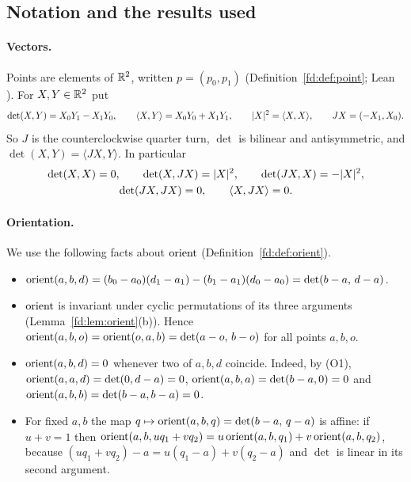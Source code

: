 \subsection{Notation and the results used}\label{lg:ssec:notation}

\paragraph{Vectors.} Points are elements of $\mathbb R^2$, written $p=(p_0,p_1)$ (Definition~\ref{fd:def:point}; Lean
). For $X,Y\in\mathbb R^2$ put
\[
  \det(X,Y)=X_0Y_1-X_1Y_0,\qquad \langle X,Y\rangle=X_0Y_0+X_1Y_1,\qquad \lvert X\rvert^2=\langle X,X\rangle,\qquad
  JX=(-X_1,X_0).
\]
So $J$ is the counterclockwise quarter turn, $\det$ is bilinear and antisymmetric, and $\det(X,Y)=\langle JX,Y\rangle$.
In particular
\begin{equation}\label{lg:eq:J}
\begin{gathered}
  \det(X,X)=0,\qquad \det(X,JX)=\lvert X\rvert^2,\qquad \det(JX,X)=-\lvert X\rvert^2,\\
  \det(JX,JX)=0,\qquad \langle X,JX\rangle=0 .
\end{gathered}
\end{equation}

\paragraph{Orientation.} We use the following facts about $\operatorname{orient}$ (Definition~\ref{fd:def:orient}).
\begin{itemize}
\item[(O1)] $\operatorname{orient}(a,b,d)=(b_0-a_0)(d_1-a_1)-(b_1-a_1)(d_0-a_0)=\det(b-a,\,d-a)$.
\item[(O2)] $\operatorname{orient}$ is invariant under cyclic permutations of its three arguments (Lemma~\ref{fd:lem:orient}(b)).
  Hence $\operatorname{orient}(a,b,o)=\operatorname{orient}(o,a,b)=\det(a-o,\,b-o)$ for all points $a,b,o$.
\item[(O3)] $\operatorname{orient}(a,b,d)=0$ whenever two of $a,b,d$ coincide. Indeed, by (O1), $\operatorname{orient}(a,a,d)=\det(0,d-a)=0$,
  $\operatorname{orient}(a,b,a)=\det(b-a,0)=0$ and $\operatorname{orient}(a,b,b)=\det(b-a,b-a)=0$.
\item[(O4)] For fixed $a,b$ the map $q\mapsto\operatorname{orient}(a,b,q)=\det(b-a,\,q-a)$ is affine: if $u+v=1$ then
  $\operatorname{orient}(a,b,uq_1+vq_2)=u\operatorname{orient}(a,b,q_1)+v\operatorname{orient}(a,b,q_2)$, because $(uq_1+vq_2)-a=u(q_1-a)+v(q_2-a)$ and $\det$ is
  linear in its second argument.
\end{itemize}

